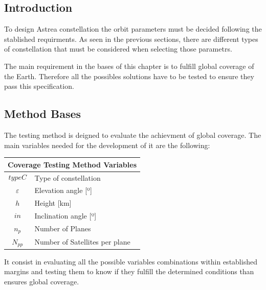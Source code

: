 \subsection{Introduction}

To design Astrea constellation the orbit parameters must be decided following the stablished requirments. As seen in the previous sections, there are different types of constellation that must be considered when selecting those parametrs. 

The main requirement in the bases of this chapter is to fulfill global coverage of the Earth. Therefore all the possibles solutions have to be tested to ensure they pass this specification.


\subsection{Method Bases}

The testing method is deigned to evaluate the achievment of global coverage. The main variables needed for the development of it are the following:

\begin{table}[H]
\centering
\begin{tabular}{|c|l|}
\hline
\multicolumn{2}{|c|}{Coverage Testing Method Variables}     \\ \hline
$$typeC$$          & Type of constellation        			 \\ \hline
$\varepsilon$      & Elevation angle {[}º{]}                  \\ \hline
$$h$$              & Height  {[}km{]}                          \\ \hline
$$in$$             & Inclination angle {[}º{]}                 \\ \hline
$n_{p}$            & Number of Planes                          \\ \hline
$N_{pp}$           & Number of Satellites per plane            \\ \hline
\end{tabular}
\end{table}  

It consist in evaluating all the possible variables combinations within established margins and  testing them to know if they fulfill the determined conditions than ensures global coverage.

